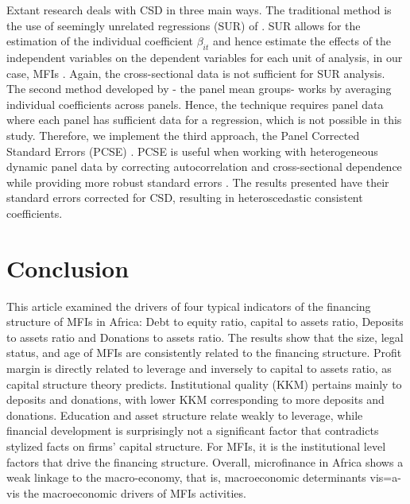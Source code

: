 \documentclass[a4paper, nobind]{templates/ociamthesis}
\begin{document}
Extant research deals with CSD in three main ways. The traditional method is the use of seemingly unrelated regressions (SUR) of \textcite{zellner1962further,arouri2013econometric}. SUR allows for the estimation of the individual coefficient \(\beta_{it}\) and hence estimate the effects of the independent variables on the dependent variables for each unit of analysis, in our case, MFIs \autocite{sarafidis2012cross}. Again, the cross-sectional data is not sufficient for SUR analysis. The second method developed by \textcite{esaran2021general} - the panel mean groups- works by averaging individual coefficients across panels. Hence, the technique requires panel data where each panel has sufficient data for a regression, which is not possible in this study. Therefore, we implement the third approach, the Panel Corrected Standard Errors (PCSE) \autocite{bailey2011implementing,croissant2008panel}. PCSE is useful when working with heterogeneous dynamic panel data by correcting autocorrelation and cross-sectional dependence while providing more robust standard errors \autocite{ikpesu2019growth}. The results presented have their standard errors corrected for CSD, resulting in heteroscedastic consistent coefficients.

\hypertarget{conclusion-4}{%
\section{Conclusion}\label{conclusion-4}}

This article examined the drivers of four typical indicators of the financing structure of MFIs in Africa: Debt to equity ratio, capital to assets ratio, Deposits to assets ratio and Donations to assets ratio. The results show that the size, legal status, and age of MFIs are consistently related to the financing structure. Profit margin is directly related to leverage and inversely to capital to assets ratio, as capital structure theory predicts. Institutional quality (KKM) pertains mainly to deposits and donations, with lower KKM corresponding to more deposits and donations. Education and asset structure relate weakly to leverage, while financial development is surprisingly not a significant factor that contradicts stylized facts on firms' capital structure. For MFIs, it is the institutional level factors that drive the financing structure. Overall, microfinance in Africa shows a weak linkage to the macro-economy, that is, macroeconomic determinants vis=a-vis the macroeconomic drivers of MFIs activities.
\end{document}
